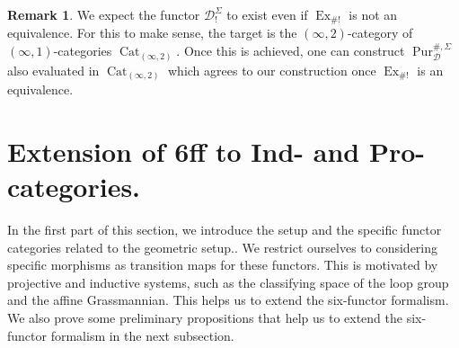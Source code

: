 \documentclass[14pt]{article}
\theoremstyle{definition}
\newtheorem{remark}[theorem]{Remark}
\newcommand{\E}{\mathcal{E}}
\newcommand{\D}{\mathcal{D}}
\newcommand{\op}[1]{\operatorname{#1}}
\renewcommand{\S}{\mathcal{S}}
\newcommand{\Ca}{\mathcal{C}}
\numberwithin{subsection}{section}
\begin{document}

\begin{remark}\label{remark:extendingpuritytocat2}
We expect the functor $\D^{\Sigma}_!$ to exist even if $\op{Ex}_{\#!}$ is not an equivalence. For this to make sense, the target is the $(\infty,2)$-category of $(\infty,1)$-categories $\op{Cat}_{(\infty,2)}$. Once this is achieved, one can construct $\op{Pur}^{\#,\Sigma}_{\D}$ also evaluated in $\op{Cat}_{(\infty,2)}$ which agrees to our construction once $\op{Ex}_{\#!}$ is an equivalence.
    
\end{remark}
\section{Extension of 6ff to Ind- and Pro-categories.}
In the first part of this section, we introduce the setup and the specific functor categories related to the geometric setup.. We restrict ourselves to considering specific morphisms as transition maps for these functors. This is motivated by projective and inductive systems, such as the classifying space of the loop group and the affine Grassmannian. This helps us to extend the six-functor formalism. We also prove some preliminary propositions that help us to extend the six-functor formalism in the next subsection.
\end{document}
